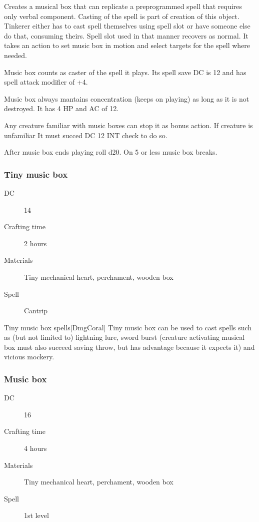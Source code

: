 Creates a musical box that can replicate a preprogrammed spell that requires only verbal component. Casting of the spell is part of
creation of this object. Tinkerer either has to cast spell themselves using spell slot or have someone else do that, consuming theirs. Spell slot used in that manner recovers as normal. It takes an action to set music box in motion and select targets for the spell where needed.

Music box counts as caster of the spell it plays. Its spell save DC is 12 and has spell attack modifier of +4.

Music box always mantains concentration (keeps on playing) as long as it is not destroyed. It has 4 HP and AC of 12.

Any creature familiar with music boxes can stop it as bonus action. If creature is unfamiliar It must succed DC 12 INT check to do so.

After music box ends playing roll d20. On 5 or less music box breaks.

\subsubsection{Tiny music box}

\begin{description}
\item [DC] 14
\item [Crafting time] 2 hours
\item [Materials] Tiny mechanical heart, perchament, wooden box
\item [Spell] Cantrip
\end{description}

\begin{commentbox}{Tiny music box spells}[DmgCoral]
Tiny music box can be used to cast spells such as (but not limited to) lightning lure, sword burst (creature activating musical box must also succeed saving throw, but has advantage because it expects it) and vicious mockery. 
\end{commentbox}

\subsubsection{Music box}

\begin{description}
\item [DC] 16
\item [Crafting time] 4 hours
\item [Materials] Tiny mechanical heart, perchament, wooden box
\item [Spell] 1st level
\end{description}

